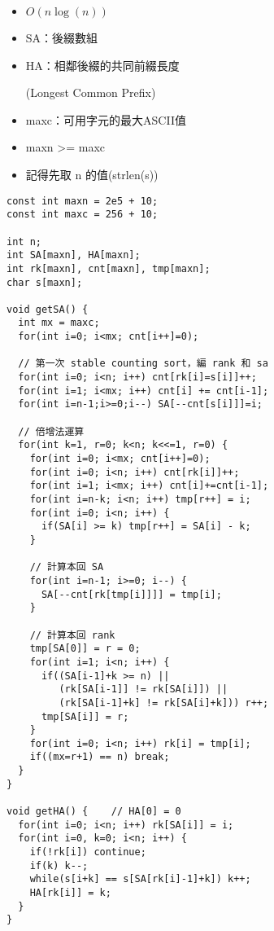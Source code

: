 \begin{itemize}
  \item $O(n\log(n))$
  \item SA：後綴數組
  \item HA：相鄰後綴的共同前綴長度 \par
        (Longest Common Prefix)
  \item maxc：可用字元的最大ASCII值
  \item maxn >= maxc
  \item 記得先取 n 的值(strlen(s))
\end{itemize}
\begin{lstlisting}
const int maxn = 2e5 + 10;
const int maxc = 256 + 10;

int n;
int SA[maxn], HA[maxn];
int rk[maxn], cnt[maxn], tmp[maxn];
char s[maxn];

void getSA() {
  int mx = maxc;
  for(int i=0; i<mx; cnt[i++]=0);

  // 第一次 stable counting sort，編 rank 和 sa
  for(int i=0; i<n; i++) cnt[rk[i]=s[i]]++;
  for(int i=1; i<mx; i++) cnt[i] += cnt[i-1];
  for(int i=n-1;i>=0;i--) SA[--cnt[s[i]]]=i;

  // 倍增法運算
  for(int k=1, r=0; k<n; k<<=1, r=0) {
    for(int i=0; i<mx; cnt[i++]=0);
    for(int i=0; i<n; i++) cnt[rk[i]]++;
    for(int i=1; i<mx; i++) cnt[i]+=cnt[i-1];
    for(int i=n-k; i<n; i++) tmp[r++] = i;
    for(int i=0; i<n; i++) {
      if(SA[i] >= k) tmp[r++] = SA[i] - k;
    }

    // 計算本回 SA
    for(int i=n-1; i>=0; i--) {
      SA[--cnt[rk[tmp[i]]]] = tmp[i];
    }

    // 計算本回 rank
    tmp[SA[0]] = r = 0;
    for(int i=1; i<n; i++) {
      if((SA[i-1]+k >= n) ||
         (rk[SA[i-1]] != rk[SA[i]]) ||
         (rk[SA[i-1]+k] != rk[SA[i]+k])) r++;
      tmp[SA[i]] = r;
    }
    for(int i=0; i<n; i++) rk[i] = tmp[i];
    if((mx=r+1) == n) break;
  }
}

void getHA() {    // HA[0] = 0
  for(int i=0; i<n; i++) rk[SA[i]] = i;
  for(int i=0, k=0; i<n; i++) {
    if(!rk[i]) continue;
    if(k) k--;
    while(s[i+k] == s[SA[rk[i]-1]+k]) k++;
    HA[rk[i]] = k;
  }
}
\end{lstlisting}